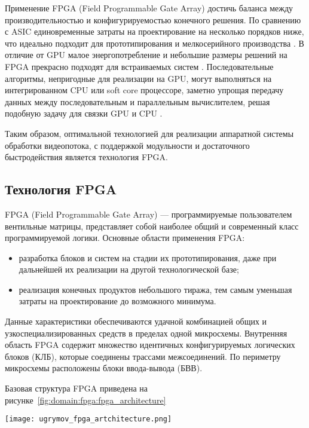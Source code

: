 Применение FPGA (Field Programmable Gate Array) достичь баланса между производительностью и конфигурируемостью конечного решения.
По сравнению с ASIC единовременные затраты на проектирование на несколько порядков ниже,
что идеально подходит для прототипирования и мелкосерийного производства \cite{zuchowski_asic_vs_fpga_cost}.
В отличие от GPU малое энергопотребление и небольшие размеры решений на FPGA прекрасно подходят
для встраиваемых систем \cite{berten_gpu_fpga_comparison}.
Последовательные алгоритмы, непригодные для реализации на GPU, могут выполняться
на интегрированном CPU или soft core процессоре, заметно упрощая передачу данных
между последовательным и параллельным вычислителем, решая подобную задачу
для связки GPU и CPU \cite{russo_softcore_fpga_vs_gpu}.

Таким образом, оптимальной технологией для реализации аппаратной системы обработки видеопотока,
с поддержкой модульности и достаточного быстродействия является технология FPGA.


\subsection{Технология FPGA}
\label{sub:domain:fpga}

FPGA (Field Programmable Gate Array) --- программируемые пользователем вентильные матрицы,
представляет собой наиболее общий и современный класс программируемой логики.
Основные области применения FPGA:
\begin{itemize}
  \item разработка блоков и систем на стадии их прототипирования, даже при дальнейшей их реализации на другой технологической базе;
  \item реализация конечных продуктов небольшого тиража, тем самым уменьшая затраты на проектирование до возможного минимума.
\end{itemize}

Данные характеристики обеспечиваются удачной комбинацией общих и узкоспециализированных средств
в пределах одной микросхемы. Внутренняя область FPGA содержит множество идентичных конфигурируемых логических блоков (КЛБ),
которые соединены трассами межсоединений. По периметру микросхемы расположены блоки ввода-вывода (БВВ).

Базовая структура FPGA приведена на рисунке~\ref{fig:domain:fpga:fpga_architecture}

\begin{center}
  \centering
  \texttt{[image: ugrymov\_fpga\_artchitecture.png]}
  \label{fig:domain:fpga:fpga_architecture}
\end{center}

